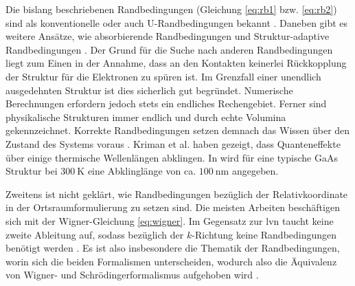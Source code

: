 Die bislang beschriebenen Randbedingungen (Gleichung \eqref{eq:rb1} bzw. \eqref{eq:rb2}) sind als konventionelle oder auch U-Randbedingungen bekannt \cite{failure}. Daneben gibt es weitere Ansätze, wie absorbierende Randbedingungen \cite{arnold1994absorbing, lukas2, lukas1} und Struktur-adaptive Randbedingungen \cite{jiang2014device}. Der Grund für die Suche nach anderen Randbedingungen liegt zum Einen in der Annahme, dass an den Kontakten keinerlei Rückkopplung der Struktur  für die Elektronen zu spüren ist. Im Grenzfall einer unendlich ausgedehnten Struktur ist dies sicherlich gut begründet. Numerische Berechnungen erfordern jedoch stets ein endliches Rechengebiet. Ferner sind physikalische Strukturen immer endlich und durch echte Volumina gekennzeichnet. Korrekte Randbedingungen setzen demnach das Wissen über den Zustand des Systems voraus \cite{ringhofer}.
Kriman et al. \cite{kriman1987scattering} haben gezeigt, dass Quanteneffekte über einige thermische Wellenlängen abklingen. In \cite{ringhofer} wird für eine typische GaAs Struktur bei $\SI{300}{\kelvin}$ eine Abklinglänge von ca. $\SI{100}{\nano\meter}$ angegeben.

Zweitens ist nicht geklärt, wie Randbedingungen bezüglich der Relativkoordinate in der Ortsraumformulierung zu setzen sind. Die meisten Arbeiten beschäftigen sich mit der Wigner-Gleichung \eqref{eq:wigner}. Im Gegensatz zur \ac{lvn} taucht keine zweite Ableitung auf, sodass bezüglich der $k$-Richtung keine Randbedingungen benötigt werden \cite{frensley2}.
Es ist also insbesondere die Thematik der Randbedingungen, worin sich die beiden Formalismen unterscheiden, wodurch also die Äquivalenz von Wigner- und Schrödingerformalismus aufgehoben wird \cite{li2014stationary}.

